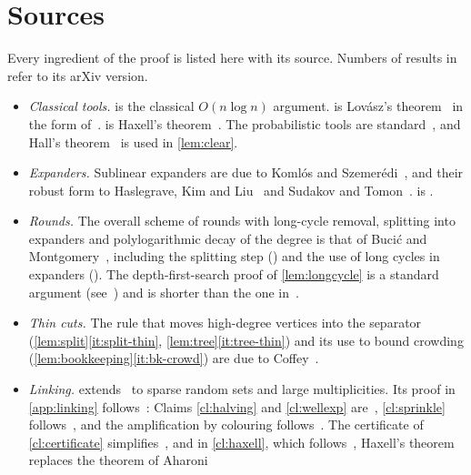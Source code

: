 \documentclass[11pt]{article}
\theoremstyle{definition}
\theoremstyle{remark}
\numberwithin{equation}{section}
\numberwithin{figure}{section}
\numberwithin{table}{section}
\begin{document}
\section{Sources}\label{sec:sources}

Every ingredient of the proof is listed here with its source. Numbers of
results in~\cite{BM} refer to its arXiv version.

\begin{itemize}[leftmargin=2em,itemsep=3pt]
\item \emph{Classical tools.}  is the classical $O(n\log n)$
argument.  is Lov\'asz's theorem~\cite{Lov} in the form
of~\cite[Corollary~22]{BM}.  is Haxell's theorem~\cite{Hax}.
The probabilistic tools are standard~\cite{JLR,Fre,McD}, and Hall's
theorem~\cite{Hal} is used in \cref{lem:clear}.
\item \emph{Expanders.} Sublinear expanders are due to Koml\'os and
Szemer\'edi~\cite{KS1,KS2}, and their robust form to Haslegrave, Kim and
Liu~\cite{HKL} and Sudakov and Tomon~\cite{ST}.  is
\cite[Definition~11]{BM}.
\item \emph{Rounds.} The overall scheme of rounds with long-cycle removal,
splitting into expanders and polylogarithmic decay of the degree is that of
Buci\'c and Montgomery~\cite{BM}, including the splitting step
(\cite[Lemma~14]{BM}) and the use of long cycles in expanders
(\cite[Lemma~25]{BM}). The depth-first-search proof of \cref{lem:longcycle} is
a standard argument (see~\cite{Kri}) and is shorter than the one in~\cite{BM}.
\item \emph{Thin cuts.} The rule that moves high-degree vertices into the
separator (\cref{lem:split}\ref{it:split-thin},
\cref{lem:tree}\ref{it:tree-thin}) and its use to bound crowding
(\cref{lem:bookkeeping}\ref{it:bk-crowd}) are due to Coffey~\cite{Cof}.
\item \emph{Linking.}  extends~\cite[Theorem~16]{BM} to sparse
random sets and large multiplicities. Its proof in \cref{app:linking}
follows~\cite{BM}: Claims \ref{cl:halving} and \ref{cl:wellexp}
are~\cite[Propositions~8 and~18]{BM}, \cref{cl:sprinkle}
follows~\cite[Lemma~17]{BM}, and the amplification by colouring
follows~\cite[Theorem~16]{BM}. The certificate of \cref{cl:certificate}
simplifies~\cite[Proposition~13]{BM}, and in \cref{cl:haxell}, which
follows~\cite[Lemma~9]{BM}, Haxell's theorem replaces the theorem of Aharoni

\end{itemize}
\end{document}
